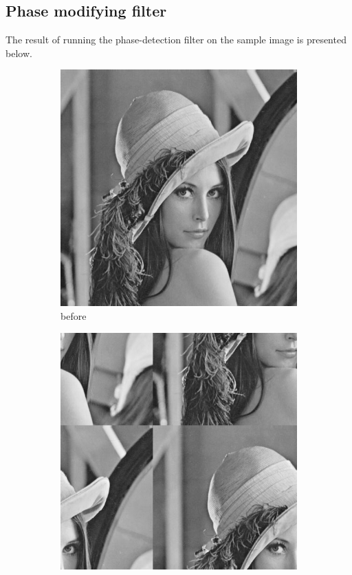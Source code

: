 \documentclass[12pt]{article}
\begin{document}
\subsection{Phase modifying filter}
 The result of running the phase-detection filter on the sample image is presented below.
\begin{figure}[H]\centering
    \begin{subfigure}[t]{\subfiguresize}\centering
        \includegraphics[width=\textwidth]{img/lena.png}
        \caption{before}
    \end{subfigure}
    \hspace{2em}
    \begin{subfigure}[t]{\subfiguresize}\centering
        \includegraphics[width=\textwidth]{img/lena_phase.png}

\end{subfigure}
\end{figure}
\end{document}
